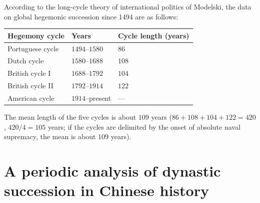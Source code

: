 \begin{example}\label{ex:hegemony_data}
According to the long-cycle theory of international politics of Modelski, the data on global hegemonic succession since 1494 are as follows:
\begin{center}
\begin{tabular}{>{\centering\arraybackslash}p{2.5cm}>{\centering\arraybackslash}p{2cm}>{\centering\arraybackslash}p{2cm}}
\toprule
Hegemony cycle & Years & Cycle length (years) \\
\midrule
Portuguese cycle & $1494$--$1580$ & $86$ \\
Dutch cycle & $1580$--$1688$ & $108$ \\
British cycle I & $1688$--$1792$ & $104$ \\
British cycle II & $1792$--$1914$ & $122$ \\
American cycle & $1914$--present & --- \\
\bottomrule
\end{tabular}
\end{center}
The mean length of the five cycles is about $109$ years ($86+108+104+122=420$, $420/4=105$ years; if the cycles are delimited by the onset of absolute naval supremacy, the mean is about $109$ years).
\end{example}

\section{A periodic analysis of dynastic succession in Chinese history}

